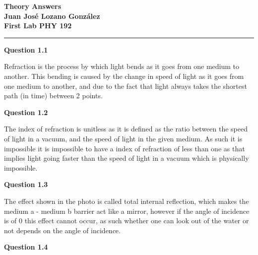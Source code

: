 \documentclass[a4paper,12pt]{article}
\begin{document}
\begin{center}
    \textbf{\Huge Theory Answers }\\
    \vspace{0.2 cm}
    \textbf{\Huge Juan José Lozano González}\\
    \vspace{0.2 cm}
    \textbf{\Huge First Lab PHY 192}\\
    \rule{\textwidth}{0.4pt}
\end{center}

\vspace{1cm}

\noindent \textbf{\LARGE Question 1.1}

\vspace{0.2cm}

Refraction is the process by which light bends as it goes from one medium to another. This bending is caused by the change in speed of light as it goes from one medium to another, and due to the fact that light always takes the shortest path (in time) between 2 points.

\vspace{0.2cm}

\noindent \textbf{\LARGE Question 1.2}

\vspace{0.2cm}

The index of refraction is unitless as it is defined as the ratio between the speed of light in a vacuum, and the speed of light in the given medium. As such it is impossible it is impossible to have a index of refraction of less than one as that implies light going faster than the speed of light in a vacuum which is physically impossible.

\vspace{0.2cm}

\noindent \textbf{\LARGE Question 1.3}

\vspace{0.2cm}

The effect shown in the photo is called total internal reflection, which makes the medium a - medium b barrier act like a mirror, however if the angle of incidence is of 0 this effect cannot occur, as such whether one can look out of the water or not depends on the angle of incidence.

\vspace{0.2cm}

\noindent \textbf{\LARGE Question 1.4}

\vspace{0.2cm}
\end{document}
